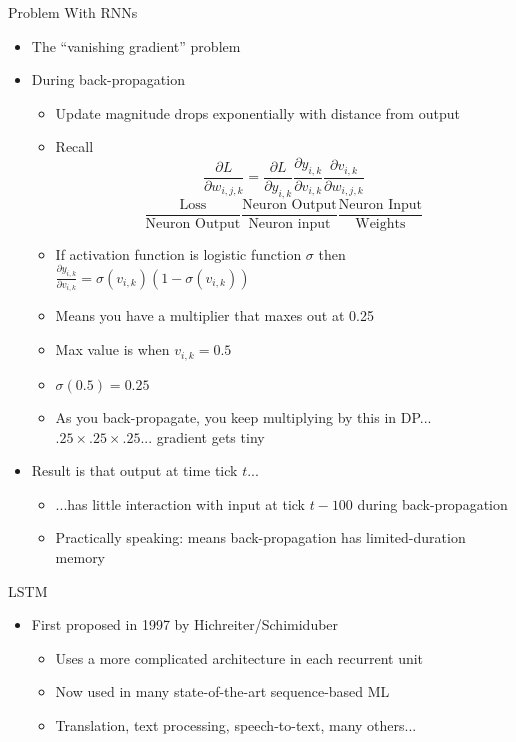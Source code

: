 \documentclass[aspectratio=169]{beamer}
\begin{document}
\begin{frame}{Problem With RNNs}

\begin{itemize}
	\item The ``vanishing gradient'' problem
	\item During back-propagation
	\begin{itemize}
	\item Update magnitude drops exponentially with distance from output
	\item Recall 
        $$ \frac{\partial L}{\partial w_{i,j,k}} = \frac{\partial L}{\partial y_{i,k}}
                                                \frac{\partial y_{i,k}}{\partial v_{i,k}}
                                                \frac{\partial v_{i,k}}{\partial w_{i,j,k}}$$
	$$  \frac{\text{Loss}}{\text{Neuron Output}}\frac{\text{Neuron Output}}{\text{Neuron input}}\frac{\text{Neuron Input}}{\text{Weights}}$$
	\item If activation function is logistic function $\sigma$ then
	$\frac{\partial y_{i,k}}{\partial v_{i,k}} = \sigma (v_{i,k})(1 - \sigma (v_{i,k}))$
	\item Means you have a multiplier that maxes out at 0.25
	\item Max value is when $v_{i,k} = 0.5$
	\item $\sigma(0.5) = 0.25$
	\item As you back-propagate, you keep multiplying by this in DP... $.25 \times .25 \times .25 ...$ gradient gets tiny
	\end{itemize}
	\item Result is that output at time tick $t$...
	\begin{itemize}
	\item ...has little interaction with input at tick $t - 100$ during back-propagation
	\item Practically speaking: means back-propagation has limited-duration memory
	\end{itemize}
\end{itemize}
\end{frame}
\begin{frame}{LSTM}

\begin{itemize}
	\item First proposed in 1997 by Hichreiter/Schimiduber
	\begin{itemize}
	\item Uses a more complicated architecture in each recurrent unit
	\item Now used in many state-of-the-art sequence-based ML
	\item Translation, text processing, speech-to-text, many others...
	\end{itemize}
\end{itemize}
\end{frame}
\end{document}
